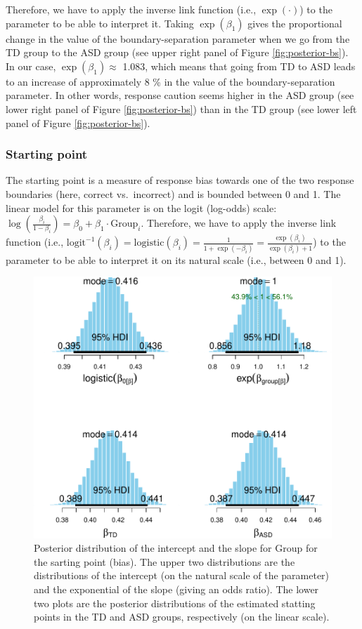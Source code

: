 \documentclass[
  11pt,
  english,
  ,doc,floatsintext]{apa6}
\begin{document}
Therefore, we have to apply the inverse link function (i.e., \(\exp(\cdot)\)) to the parameter to be able to interpret it. Taking \(\exp(\beta_{1})\) gives the proportional change in the value of the boundary-separation parameter when we go from the TD group to the ASD group (see upper right panel of Figure \ref{fig:posterior-bs}). In our case, \(\exp(\beta_{1}) \approx\) 1.083, which means that going from TD to ASD leads to an increase of approximately 8 \% in the value of the boundary-separation parameter. In other words, response caution seems higher in the ASD group (see lower right panel of Figure \ref{fig:posterior-bs}) than in the TD group (see lower left panel of Figure \ref{fig:posterior-bs}).

\hypertarget{starting-point}{%
\subsubsection{Starting point}\label{starting-point}}

The starting point is a measure of response bias towards one of the two response boundaries (here, correct vs.~incorrect) and is bounded between 0 and 1. The linear model for this parameter is on the logit (log-odds) scale: \(\log(\frac{\beta_{i}}{1 - \beta_{i}}) = \beta_{0} + \beta_{1} \cdot \text{Group}_{i}\). Therefore, we have to apply the inverse link function (i.e., \(\mathrm{logit}^{-1}(\beta_{i}) = \mathrm{logistic}(\beta_{i}) = \frac{1}{1 + \exp(- \beta_{i})} = \frac{\exp(\beta_{i})}{\exp(\beta_{i}) + 1}\)) to the parameter to be able to interpret it on its natural scale (i.e., between 0 and 1).

\begin{figure}[!htb]

{\centering \includegraphics[width=0.75\linewidth]{supplementary_materials_files/figure-latex/posterior-bias-1} 

}

\caption{Posterior distribution of the intercept and the slope for Group for the sarting point (bias). The upper two distributions are the distributions of the intercept (on the natural scale of the parameter) and the exponential of the slope (giving an odds ratio). The lower two plots are the posterior distributions of the estimated statting points in the TD and ASD groups, respectively (on the linear scale).}\label{fig:posterior-bias}
\end{figure}
\end{document}
